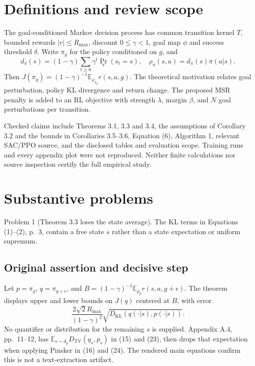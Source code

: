 \documentclass[10pt]{article}
\begin{document}
\section*{Definitions and review scope}
The goal-conditioned Markov decision process has common transition kernel \(T\), bounded rewards \(|r|\le R_{\max}\), discount \(0\le\gamma<1\), goal map \(\phi\) and success threshold \(\delta\). Write \(\pi_g\) for the policy conditioned on \(g\), and \[d_{\pi}(s)=(1-\gamma)\sum_{t\ge0}\gamma^t\Pr_\pi(s_t=s),
 \quad \rho_\pi(s,a)=d_\pi(s)\pi(a|s).\] Then \(J(\pi_g)=(1-\gamma)^{-1}\mathbb E_{\rho_{\pi_g}}r(s,a,g)\). The theoretical motivation relates goal perturbation, policy KL divergence and return change. The proposed MSR penalty is added to an RL objective with strength \(\lambda\), margin \(\beta\), and \(N\) goal perturbations per transition.\par
Checked claims include Theorems 3.1, 3.3 and 3.4, the assumptions of Corollary 3.2 and the bounds in Corollaries 3.5–3.6, Equation (6), Algorithm 1, relevant SAC/PPO source, and the disclosed tables and evaluation scope. Training runs and every appendix plot were not reproduced. Neither finite calculations nor source inspection certify the full empirical study.\par
\section*{Substantive problems}
Problem 1 (Theorem 3.3 loses the state average).  The KL terms in Equations (1)–(2), p. 3, contain a free state \(s\) rather than a state expectation or uniform supremum.\par
\subsection*{Original assertion and decisive step}
Let \(p=\pi_g\), \(q=\pi_{g+\epsilon}\), and \(B=(1-\gamma)^{-1}\mathbb E_{\rho_p}r(s,a,g+\epsilon)\). The theorem displays upper and lower bounds on \(J(q)\) centered at \(B\), with error \[\frac{2\sqrt2R_{\max}}{(1-\gamma)^2}
 \sqrt{D_{\mathrm{KL}}(q(\cdot|s),p(\cdot|s))}.\] No quantifier or distribution for the remaining \(s\) is supplied. Appendix A.4, pp. 11–12, has \(\mathbb E_{s\sim d_p}D_{\mathrm{TV}}(q_s,p_s)\) in (15) and (23), then drops that expectation when applying Pinsker in (16) and (24). The rendered main equations confirm this is not a text-extraction artifact.\par
\end{document}
